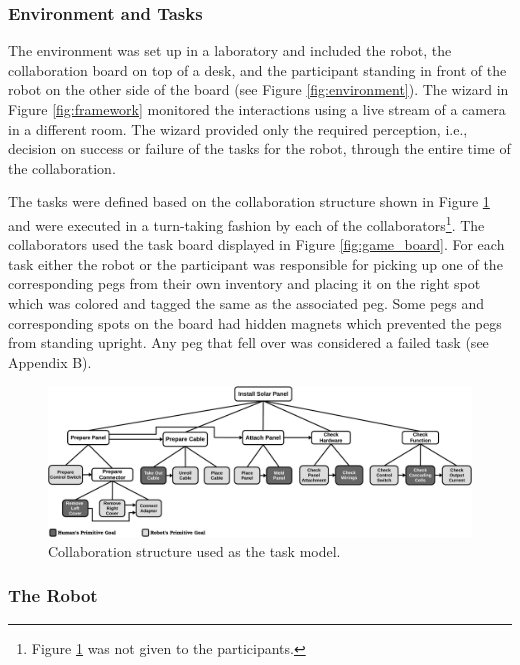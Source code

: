 \documentclass[12pt]{report}
\begin{document}
\subsubsection{Environment and Tasks}

The environment was set up in a laboratory and included the robot, the
collaboration board on top of a desk, and the participant standing in front of
the robot on the other side of the board (see Figure \ref{fig:environment}). The
wizard in Figure \ref{fig:framework} monitored the interactions using a live
stream of a camera in a different room. The wizard provided only the required
perception, i.e., decision on success or failure of the tasks for the robot,
through the entire time of the collaboration.

The tasks were defined based on the collaboration structure shown in Figure
\ref{fig:collaboration_structure} and were executed in a turn-taking fashion by
each of the collaborators\footnote{Figure
\ref{fig:collaboration_structure} was not given to the participants.}. The
collaborators used the task board displayed in Figure \ref{fig:game_board}. For
each task either the robot or the participant was responsible for picking up one
of the corresponding pegs from their own inventory and placing it on the right
spot which was colored and tagged the same as the associated peg. Some pegs and
corresponding spots on the board had hidden magnets which prevented the pegs
from standing upright. Any peg that fell over was considered a failed task
(see Appendix B).

\begin{figure}[t]
  \centering
  \includegraphics[width=1\textwidth]{figure/collaborationStructure-croped.pdf}
  \caption{Collaboration structure used as the task model.}
  \label{fig:collaboration_structure}
\end{figure}

\subsubsection{The Robot}
\end{document}
